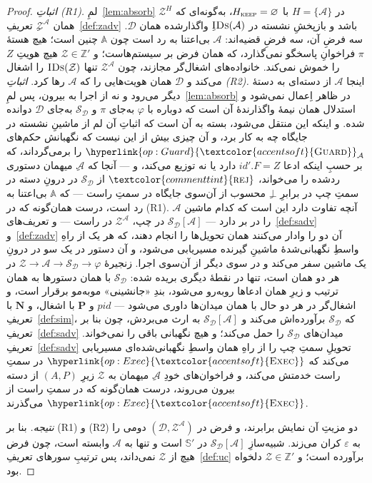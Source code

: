 \documentclass[10pt,oneside,openany]{book}
\newcommand{\Ps}{\mathbf{P}}
\newcommand{\PID}{\mathit{pid}}
\renewcommand{\emptyset}{\varnothing}
\newcommand{\admits}{\mathbf{N}}
\newcommand{\Zenv}{\mathcal{Z}}
\newcommand{\Adv}{\mathcal{A}}
\newcommand{\Dum}{\mathcal{D}}
\newcommand{\Sim}{\mathcal{S}}
\newcommand{\Aset}{\mathbb{A}}
\newcommand{\SimSet}{\mathbb{S}}
\newcommand{\ZenvSet}{\mathbb{Z}}
\newcommand{\op}[1]{\textnormal{\textsc{#1}}}
\newcommand{\opl}[1]{\hyperlink{op:#1}{\textcolor{accentsoft}{\op{#1}}}}
\newcommand{\IDs}{\op{IDs}}
\newcommand{\id}{id}
\newcommand{\atom}[1]{\textcolor{commenttint}{\op{#1}}}
\newcommand{\rej}{\atom{rej}}
\newcommand{\none}{\bot}
\theoremstyle{accentdef}
\theoremstyle{accentplain}
\begin{document}
\begin{proof}
\emph{اثباتِ \textnormal{(R1)}.} لمِ~\ref{lem:absorb} در $H = \{\Adv\}$ با
$H_{\op{keep}} = \emptyset$، به‌گونه‌ای که $\Zenv^{H}$ همان
$\Zenv^{\Adv}$ِ تعریفِ~\ref{def:zadv} باشد و بازپخشِ نشسته در
$\IDs(\Adv)$ِ واگذارشده همان $\Dum$. سه فرضِ آن، سه فرضِ قضیه‌اند: $\Adv$
بی‌اعتنا به رد است چون $\Aset$ چنین است؛ هیچ هستهٔ $\pi$ فراخوانِ پاسخگو
نمی‌گذارد، که همان فرض بر سیستم‌هاست؛ و $\Zenv \in \ZenvSet'$ هیچ هویتِ
$Z$ را خموش نمی‌کند. خانواده‌های اشغال‌گر مجازند، چون $\Zenv^{\Adv}$ تنها
$\IDs(\Zenv)$ را اشغال می‌کند و $\Dum$ همان هویت‌هایی را که $\Adv$ رها
کرد.
\emph{اثباتِ \textnormal{(R2)}.} اینجا $\Adv$ از دسته‌ای به دستهٔ دیگر
می‌رود و نه از اجرا به بیرون، پس لمِ~\ref{lem:absorb} در ظاهر اِعمال
نمی‌شود و استدلال همان نیمهٔ واگذارندهٔ آن است که دوباره با $\varphi$
به‌جای $\pi$ و $\Sim_{\Dum}$ به‌جای $\Dum$ دوانده شده. و اینکه این منتقل
می‌شود، بسته به آن است که اثباتِ آن لم از ماشینِ نشسته در جایگاه چه به کار
برد، و آن چیزی بیش از این نیست که نگهبانش حکم‌های $\opl{Guard}_{\Adv}$ را
برمی‌گرداند، که بر حسبِ اینکه ادعا $\id'.F = Z$ دارد یا نه توزیع می‌کند،
و --- آنجا که $\Adv$ِ میهمان دستوری ردشده را می‌خواند، $\rej$ از
$\Sim_{\Dum}$ در درونِ دسته در سمتِ چپ در برابرِ $\none$ِ محسوب از آن‌سوی
جایگاه در سمتِ راست --- که $\Aset$ بی‌اعتنا به رد است، درست همان‌گونه که
در (R1). آنچه تفاوت دارد این است که کدام ماشین $\Adv$ را در بر دارد ---
$\Sim_{\Dum}[\Adv]$ در چپ، $\Zenv^{\Adv}$ در راست --- و
تعریف‌های~\ref{def:sadv} و~\ref{def:zadv} آن دو را وادار می‌کنند همان
تحویل‌ها را انجام دهند، که هر یک از راهِ واسطِ نگهبانی‌شدهٔ ماشینِ گیرنده
مسیریابی می‌شود، و آن دستور در یک سو در درونِ یک ماشین سفر می‌کند و در سوی
دیگر از آن‌سوی اجرا. زنجیرهٔ $\Zenv \to \Adv \to \Sim_{\Dum} \to \varphi$
در هر دو همان است، تنها در نقطهٔ دیگری بریده شده: $\Sim_{\Dum}$ با همان
دستورها به همان ترتیب و زیرِ همان ادعاها روبه‌رو می‌شود، بندِ «جانشینی»
مو‌به‌مو برقرار است، و اشغال‌گر در هر دو حال با همان میدان‌ها داوری
می‌شود --- $\PID$ و $\Ps$ با اشغال، و $\admits$ با تعریفِ~\ref{def:sim}،
که $\Sim_{\Dum}$ برآورده‌اش می‌کند و $\Sim_{\Dum}[\Adv]$ به ارث می‌بردش،
چون بنا بر تعریفِ~\ref{def:sadv} میدان‌های $\Sim_{\Dum}$ را حمل می‌کند؛ و
هیچ نگهبانی باقی را نمی‌خواند. تعریفِ~\ref{def:sadv} تحویلِ سمتِ چپ را از
راهِ همان واسطِ نگهبانی‌شده‌ای مسیریابی می‌کند که $\opl{Exec}$ در سمتِ
راست خدمتش می‌کند، و فراخوان‌های خودِ $\Adv$ِ میهمان به $\Zenv$ زیرِ
$(A,P)$ از دسته بیرون می‌روند، درست همان‌گونه که در سمتِ راست از
$\opl{Exec}$ می‌گذرند.

\emph{نتیجه.} بنا بر (R1) و (R2) دو مزیتِ آن نمایش برابرند، و فرض در
$(\Dum,\Zenv^{\Adv})$ دومی را به $\varepsilon$ کران می‌زند. شبیه‌سازِ
$\Sim_{\Dum}[\Adv]$ در $\SimSet'$ است و تنها به $\Adv$ وابسته است، چون فرض
هیچ از $\Zenv$ نمی‌داند، پس ترتیبِ سورهای تعریفِ~\ref{def:uc} برآورده
است؛ و $\Zenv \in \ZenvSet'$ دلخواه بود.
\end{proof}
\end{document}
